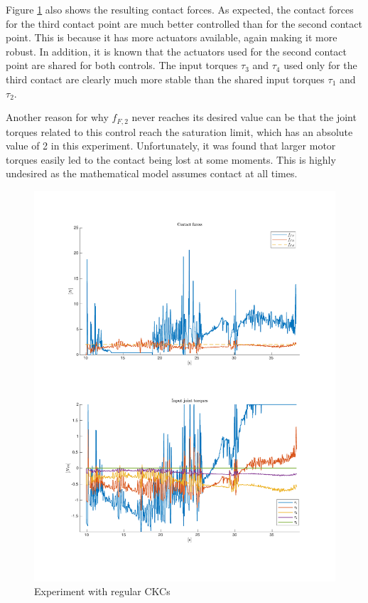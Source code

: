 Figure \ref{fig:2xf-bigJ} also shows the resulting contact forces. As expected, the contact forces for the third contact point are much better controlled than for the second contact point. This is because it has more actuators available, again making it more robust. In addition, it is known that the actuators used for the second contact point are shared for both controls. The input torques $\tau_3$ and $\tau_4$ used only for the third contact are clearly much more stable than the shared input torques $\tau_1$ and $\tau_2$.

Another reason for why $f_{F,2}$ never reaches its desired value can be that the joint torques related to this control reach the saturation limit, which has an absolute value of 2 in this experiment. Unfortunately, it was found that larger motor torques easily led to the contact being lost at some moments. This is highly undesired as the mathematical model assumes contact at all times.

\begin{figure}
    \centering
    \includegraphics[trim=2cm 2cm 2cm 2cm, clip=true, width=\textwidth]{figures/experiments/2xf/bigJ-2plot.pdf}
    \caption{Experiment with regular CKCs}
    \label{fig:2xf-bigJ}
\end{figure}

